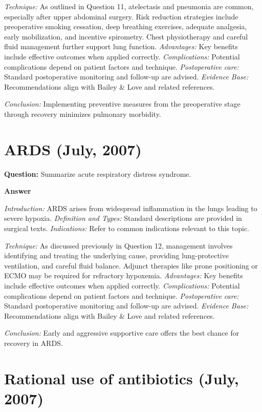 \documentclass{article}
\begin{document}
\emph{Technique:} As outlined in Question 11, atelectasis and pneumonia are common, especially after upper abdominal surgery. Risk reduction strategies include preoperative smoking cessation, deep breathing exercises, adequate analgesia, early mobilization, and incentive spirometry. Chest physiotherapy and careful fluid management further support lung function.
\emph{Advantages:} Key benefits include effective outcomes when applied correctly.
\emph{Complications:} Potential complications depend on patient factors and technique.
\emph{Postoperative care:} Standard postoperative monitoring and follow-up are advised.
\emph{Evidence Base:} Recommendations align with Bailey \& Love and related references.

\emph{Conclusion:} Implementing preventive measures from the preoperative stage through recovery minimizes pulmonary morbidity.


\section{ARDS (July, 2007)}

\textbf{Question:} Summarize acute respiratory distress syndrome.

\textbf{Answer}

\emph{Introduction:} ARDS arises from widespread inflammation in the lungs leading to severe hypoxia.
\emph{Definition and Types:} Standard descriptions are provided in surgical texts.
\emph{Indications:} Refer to common indications relevant to this topic.

\emph{Technique:} As discussed previously in Question 12, management involves identifying and treating the underlying cause, providing lung-protective ventilation, and careful fluid balance. Adjunct therapies like prone positioning or ECMO may be required for refractory hypoxemia.
\emph{Advantages:} Key benefits include effective outcomes when applied correctly.
\emph{Complications:} Potential complications depend on patient factors and technique.
\emph{Postoperative care:} Standard postoperative monitoring and follow-up are advised.
\emph{Evidence Base:} Recommendations align with Bailey \& Love and related references.

\emph{Conclusion:} Early and aggressive supportive care offers the best chance for recovery in ARDS.


\section{Rational use of antibiotics (July, 2007)}
\end{document}
